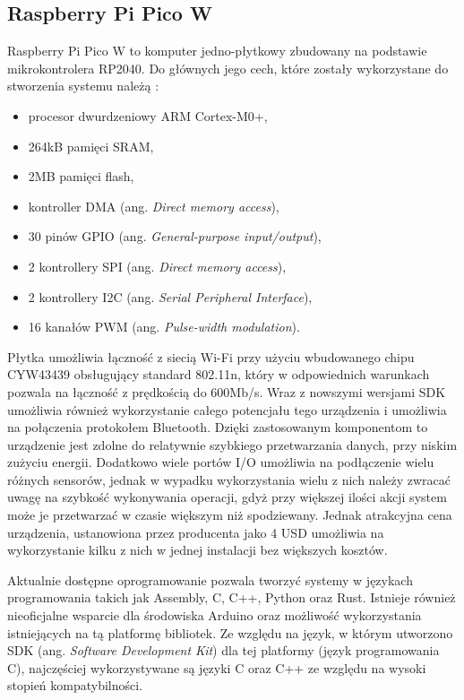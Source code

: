 \subsection*{Raspberry Pi Pico W}
Raspberry Pi Pico W to komputer jedno-płytkowy zbudowany na podstawie mikrokontrolera RP2040. 
Do głównych jego cech, które zostały wykorzystane do stworzenia systemu należą \cite{rp2040:datasheet}:
\begin{itemize}
  \item procesor dwurdzeniowy ARM Cortex-M0+,
  \item 264kB pamięci SRAM,
  \item 2MB pamięci flash,
  \item kontroller DMA (ang. \textit{Direct memory access}),
  \item 30 pinów GPIO (ang. \textit{General-purpose input/output}),
  \item 2 kontrollery SPI (ang. \textit{Direct memory access}),
  \item 2 kontrollery I2C (ang. \textit{Serial Peripheral Interface}),
  \item 16 kanałów PWM (ang. \textit{Pulse-width modulation}).
\end{itemize}
Płytka umożliwia łączność z siecią Wi-Fi przy użyciu wbudowanego chipu CYW43439
obsługujący standard 802.11n, który w odpowiednich warunkach pozwala na łączność
z prędkością do 600Mb/s. Wraz z nowszymi wersjami SDK umożliwia również wykorzystanie
całego potencjału tego urządzenia i umożliwia na połączenia protokołem Bluetooth.
Dzięki zastosowanym komponentom to urządzenie jest zdolne do relatywnie szybkiego 
przetwarzania danych, przy niskim zużyciu energii. Dodatkowo wiele portów I/O umożliwia
na podłączenie wielu różnych sensorów, jednak w wypadku wykorzystania wielu z nich
należy zwracać uwagę na szybkość wykonywania operacji, gdyż przy większej ilości akcji
system może je przetwarzać w czasie większym niż spodziewany. Jednak atrakcyjna cena urządzenia,
ustanowiona przez producenta jako 4 USD umożliwia na wykorzystanie kilku z nich w jednej instalacji
bez większych kosztów.

Aktualnie dostępne oprogramowanie pozwala tworzyć systemy w językach programowania takich jak
Assembly, C, C++, Python oraz Rust. Istnieje również nieoficjalne wsparcie dla środowiska
Arduino oraz możliwość wykorzystania istniejących na tą platformę bibliotek.
Ze względu na język, w którym utworzono SDK (ang. \textit{Software Development Kit}) dla
tej platformy (język programowania C), najczęściej wykorzystywane są języki C oraz C++
ze względu na wysoki stopień kompatybilności.

